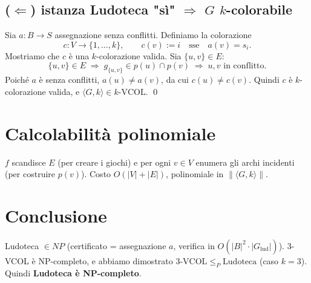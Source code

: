 \documentclass{report}
\begin{document}
\subsection*{($\Leftarrow$) istanza Ludoteca "sì" $\Rightarrow$ $G$ $k$-colorabile}

Sia $a : B \to S$ assegnazione senza conflitti. Definiamo la colorazione
\[
  c : V \to \{1, \ldots, k\}, \qquad c(v) := i \quad \text{sse} \quad a(v) = s_i.
\]
Mostriamo che $c$ è una $k$-colorazione valida. Sia $\{u, v\} \in E$:
\[
  \{u, v\} \in E \;\Rightarrow\; g_{\{u,v\}} \in p(u) \cap p(v) \;\Rightarrow\; u, v \text{ in conflitto}.
\]
Poiché $a$ è senza conflitti, $a(u) \neq a(v)$, da cui $c(u) \neq c(v)$. Quindi $c$ è $k$-colorazione valida, e $\langle G, k\rangle \in k\text{-VCOL}$. \qed

\section*{Calcolabilità polinomiale}

$f$ scandisce $E$ (per creare i giochi) e per ogni $v \in V$ enumera gli archi incidenti (per costruire $p(v)$). Costo $O(|V| + |E|)$, polinomiale in $\|\langle G, k\rangle\|$.

\section*{Conclusione}

Ludoteca $\in NP$ (certificato = assegnazione $a$, verifica in $O(|B|^2 \cdot |G_{\text{lud}}|)$). $3$-VCOL è NP-completo, e abbiamo dimostrato $3\text{-VCOL} \leq_P \text{Ludoteca}$ (caso $k = 3$). Quindi \textbf{Ludoteca è NP-completo}.
\end{document}
